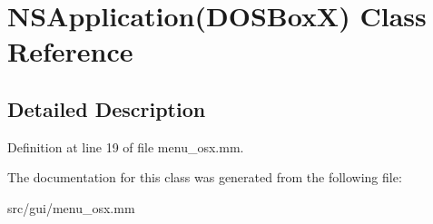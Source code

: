 \hypertarget{interfaceNSApplication_07DOSBoxX_08}{\section{N\-S\-Application(D\-O\-S\-Box\-X) Class Reference}
\label{interfaceNSApplication_07DOSBoxX_08}
}


\subsection{Detailed Description}


Definition at line 19 of file menu\-\_\-osx.\-mm.



The documentation for this class was generated from the following file\-:\begin{DoxyCompactItemize}
\item 
src/gui/menu\-\_\-osx.\-mm\end{DoxyCompactItemize}
